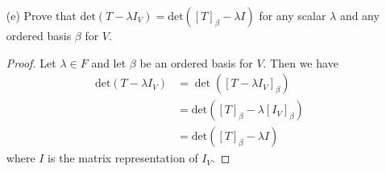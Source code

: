 \begin{enumerate}
\begin{proof}
        \begin{align*}
            \text{det}(TU) &= \text{det}([TU]_{\beta}) \\
                           &= \text{det}([T]_{\beta} [U]_{\beta}) \tag{Corollary to Thereom 2.11}  \\
                           &=  \text{det}([T]_{\beta}) \text{det}([U]_{\beta}) \tag{Corollary to Theorem 4.7} \\
                           &= \text{det}(T) \text{det}(U).
        \end{align*}
        Thus, we have \( \text{det}(TU) = \text{det}(T) \text{det}(U) \).
        \end{proof}
    \item[(e)] Prove that \( \text{det}(T - \lambda {I}_{V} ) = \text{det}([T]_{\beta} - \lambda I ) \) for any scalar \( \lambda  \) and any ordered basis \( \beta  \) for \( V  \).
        \begin{proof}
        Let \( \lambda \in F  \) and let \( \beta  \) be an ordered basis for \( V  \). Then we have
        \begin{align*}
            \text{det}(T - \lambda {I}_{V} ) &= \det([T - \lambda {I}_{V} ]_{\beta}) \\
                                             &= \text{det}( [T]_{\beta} - \lambda [{I}_{V}]_{\beta} ) \tag{parts (a) and (b) of Theorem 2.8} \\
                                             &= \text{det}([T]_{\beta} - \lambda I)
        \end{align*}
        where \( I  \) is the matrix representation of \( {I}_{V} \).
        \end{proof}
\end{enumerate}

